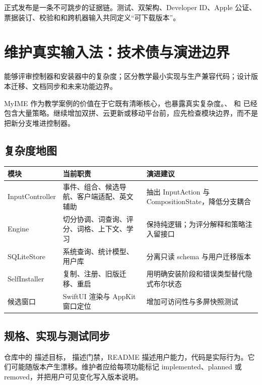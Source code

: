 \begin{summarybox}
正式发布是一条不可跳步的证据链。测试、双架构、Developer ID、Apple 公证、票据装订、校验和和跨机器输入共同定义“可下载版本”。
\end{summarybox}


\chapter{维护真实输入法：技术债与演进边界}

\begin{goals}
能够评审控制器和安装器中的复杂度；区分教学最小实现与生产兼容代码；设计版本迁移、文档同步和未来功能边界。
\end{goals}

MyIME 作为教学案例的价值在于它既有清晰核心，也暴露真实复杂度。、 和  已经包含大量策略。继续增加双拼、云更新或移动平台前，应先检查模块边界，而不是把新分支堆进控制器。

\section{复杂度地图}

\begin{center}
\begin{tabularx}{\linewidth}{p{3cm}X X}
\toprule
模块 & 当前职责 & 演进建议 \\
\midrule
InputController & 事件、组合、候选导航、客户端适配、英文辅助 & 抽出 InputAction 与 CompositionState，降低分支耦合 \\
Engine & 切分协调、词查询、评分、词格、上下文、学习 & 保持纯逻辑；为评分解释和策略注入留接口 \\
SQLiteStore & 系统查询、统计模型、用户库 & 分离只读 schema 与用户迁移版本 \\
SelfInstaller & 复制、注册、旧版迁移、重启 & 用明确安装阶段和错误类型替代隐式布尔状态 \\
候选窗口 & SwiftUI 渲染与 AppKit 窗口定位 & 增加可访问性与多屏快照测试 \\
\bottomrule
\end{tabularx}
\end{center}

\section{规格、实现与测试同步}

仓库中的  描述目标， 描述门禁，README 描述用户能力，代码是实际行为。它们可能随版本产生漂移。维护者应给每项功能标记 implemented、planned 或 removed，并把用户可见变化写入版本说明。

